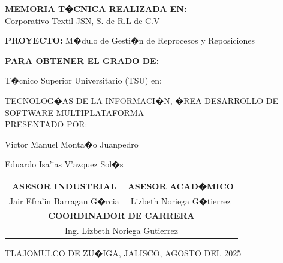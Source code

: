 \documentclass[12pt,letterpaper,spanish, xcolor=table]{report}
\begin{document}
\begin{center}

\large{\textbf{MEMORIA T�CNICA REALIZADA EN:}}
 \\  Corporativo Textil JSN, S. de R.L de C.V

\centerline{\hbox{}}

\large{\textbf{PROYECTO:} M�dulo de Gesti�n de Reprocesos y Reposiciones}

\vspace{0.1in}
\large{\textbf{PARA OBTENER EL GRADO DE:}}

\large{T�cnico Superior Universitario (TSU) en:}
\vspace{0.05in}

\large{TECNOLOG�AS DE LA INFORMACI�N, �REA DESARROLLO DE SOFTWARE MULTIPLATAFORMA }
\\
\large{PRESENTADO POR:}


Victor Manuel Monta�o Juanpedro %


Eduardo Isa'ias V'azquez Sol�s %

\vspace{0.2in}

\begin{tabular}{cc}
    \vspace{0.2in}
    \textbf{ASESOR INDUSTRIAL} & \textbf{ASESOR ACAD�MICO} \\

    Jair Efra'in Barragan G�rcia & Lizbeth Noriega G�tierrez \\
    \multicolumn{2}{c}{\textbf{COORDINADOR DE CARRERA}
    \vspace{0.2in}
    } \\

    \multicolumn{2}{c}{
            Ing. Lizbeth Noriega Gutierrez }
    \end{tabular}

\end{center}
\begin{flushright}\small{ TLAJOMULCO DE ZU�IGA, JALISCO, AGOSTO DEL 2025} \end{flushright}

\newpage


\end{document}
